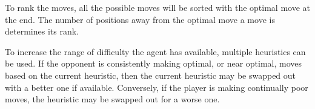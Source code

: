 \documentclass[12pt]{article}
\begin{document}
To rank the moves, all the possible moves will be sorted with the optimal move at the end. The number of positions away from the optimal move a move is determines its rank.

To increase the range of difficulty the agent has available, multiple heuristics can be used. If the opponent is consistently making optimal, or near optimal, moves based on the current heuristic, then the current heuristic may be swapped out with a better one if available. Conversely, if the player is making continually poor moves, the heuristic may be swapped out for a worse one.
\end{document}
